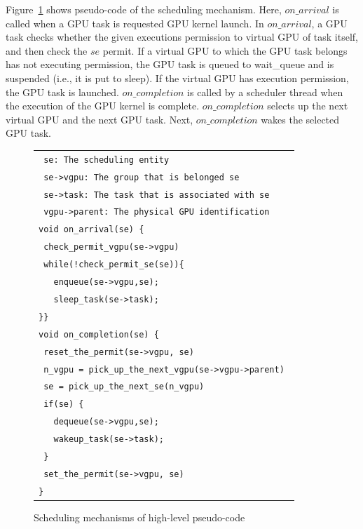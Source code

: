 Figure~\ref{fig:scheduling} shows pseudo-code of the scheduling mechanism.
Here, $on\_arrival$ is called when a GPU task is requested GPU kernel launch.
In $on\_arrival$, a GPU task checks whether the given executions permission to virtual GPU of task itself, and then check the $se$ permit.
If a virtual GPU to which the GPU task belongs has not executing permission, the GPU task is queued to wait\_queue and is suspended (i.e., it is put to sleep).
If the virtual GPU has execution permission, the GPU task is launched.
$on\_completion$ is called by a scheduler thread when the execution of the GPU kernel is complete.
$on\_completion$ selects up the next virtual GPU and the next GPU task.
Next, $on\_completion$ wakes the selected GPU task.

\begin{figure}[!t]
\begin{center}
\begin{tabular}{l}
\hline
{\scriptsize \verb| se: The scheduling entity |}\\
{\scriptsize \verb| se->vgpu: The group that is belonged se|}\\
{\scriptsize \verb| se->task: The task that is associated with se |}\\
{\scriptsize \verb| vgpu->parent: The physical GPU identification|}\\
\hline
{\scriptsize \verb|void on_arrival(se) {|}\\
{\scriptsize \verb| check_permit_vgpu(se->vgpu)    |}\\
{\scriptsize \verb| while(!check_permit_se(se)){|}\\
{\scriptsize \verb|   enqueue(se->vgpu,se); |}\\
{\scriptsize \verb|   sleep_task(se->task); |}\\
{\scriptsize \verb|}}|}\\
{\scriptsize \verb|void on_completion(se) {|}\\
{\scriptsize \verb| reset_the_permit(se->vgpu, se)|}\\
{\scriptsize \verb| n_vgpu = pick_up_the_next_vgpu(se->vgpu->parent) |}\\
{\scriptsize \verb| se = pick_up_the_next_se(n_vgpu)|}\\
{\scriptsize \verb| if(se) {|}\\
{\scriptsize \verb|   dequeue(se->vgpu,se);|}\\
{\scriptsize \verb|   wakeup_task(se->task);|}\\
{\scriptsize \verb| }|}\\
{\scriptsize \verb| set_the_permit(se->vgpu, se)|}\\
{\scriptsize \verb|}|}\\
\hline
\end{tabular}
\caption{Scheduling mechanisms of high-level pseudo-code}
\label{fig:scheduling}
\end{center}
\end{figure}

